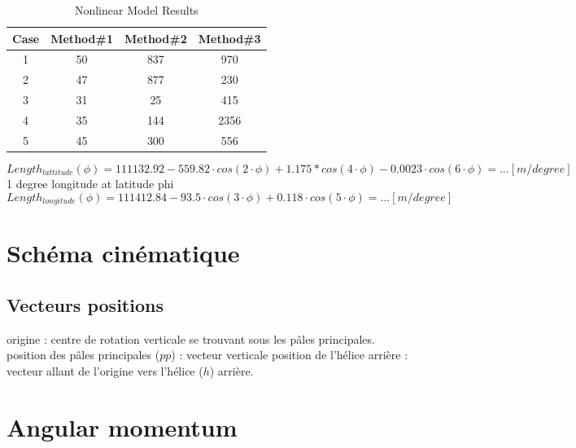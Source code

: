 \documentclass[12pt,a4paper]{article}
\begin{document}
	\begin{table}[ht]
		\caption{Nonlinear Model Results} %
		\centering %
		\begin{tabular}{c c c c} %
			\hline\hline %
			Case & Method\#1 & Method\#2 & Method\#3 \\ [0.5ex] %
			\hline %
			1 & 50 & 837 & 970 \\ %
			2 & 47 & 877 & 230 \\
			3 & 31 & 25 & 415 \\
			4 & 35 & 144 & 2356 \\
			5 & 45 & 300 & 556 \\ [1ex] %
			\hline %
		\end{tabular}\label{table:nonlin} %
	\end{table}
	
	
	
	\begin{equation}
		Length_{lattitude}(\phi) = 111132.92-559.82 \cdot cos(2 \cdot \phi)+1.175*cos(4 \cdot \phi)-0.0023 \cdot cos(6 \cdot \phi)= ... [m/degree]
	\end{equation}
	1 degree longitude at latitude phi
	\begin{equation}
		Length_{longitude}(\phi) =
		111412.84-93.5 \cdot cos(3 \cdot \phi)+ 0.118 \cdot cos(5 \cdot \phi)= ... [m/degree]
	\end{equation}
	
	\newpage
	\section{Schéma cinématique}
	
	
	\subsection{Vecteurs positions}
	origine : centre de rotation verticale se trouvant sous les pâles principales.
	\medbreak
	position  des pâles principales ($pp$) : vecteur verticale
	\medbreak
	position de l'hélice arrière : 
	vecteur allant de l'origine vers l'hélice ($h$) arrière. 
	
	
	\newpage
	\section{Angular momentum}
	
\end{document}
